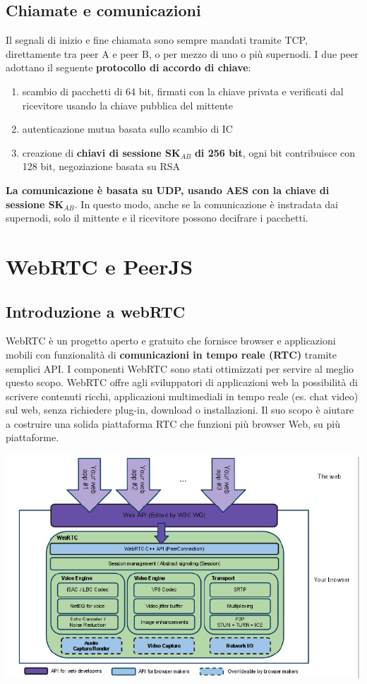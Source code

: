 \section{Chiamate e comunicazioni}
Il segnali di inizio e fine chiamata sono sempre mandati tramite TCP, direttamente tra peer A e peer B, o per mezzo di uno o più supernodi. I due peer adottano il seguente \textbf{protocollo di accordo di chiave}:
\begin{enumerate}
    \item scambio di pacchetti di 64 bit, firmati con la chiave privata e verificati dal ricevitore usando la chiave pubblica del mittente
    \item autenticazione mutua basata sullo scambio di IC
    \item creazione di \textbf{chiavi di sessione SK}$_{AB}$ \textbf{di 256 bit}, ogni bit contribuisce con 128 bit, negoziazione basata su RSA
\end{enumerate}
\textbf{La comunicazione è basata su UDP, usando AES con la chiave di sessione SK}$_{AB}$. In questo modo, anche se la comunicazione è instradata dai supernodi, solo il mittente e il ricevitore possono decifrare i pacchetti.


\chapter{WebRTC e PeerJS}
\section{Introduzione a webRTC}
WebRTC è un progetto aperto e gratuito che fornisce browser e applicazioni mobili con funzionalità di \textbf{comunicazioni in tempo reale (RTC)} tramite semplici API. I componenti WebRTC sono stati ottimizzati per servire al meglio questo scopo. WebRTC offre agli sviluppatori di applicazioni web la possibilità di scrivere contenuti ricchi, applicazioni multimediali in tempo reale (es. chat video) sul web, senza richiedere plug-in, download o installazioni.
Il suo scopo è aiutare a costruire una solida piattaforma RTC che funzioni
più browser Web, su più piattaforme.

\begin{center}
    \includegraphics[scale = 0.4]{Images/P2P/ArchitetturaWebRTC.jpg}
\end{center}

